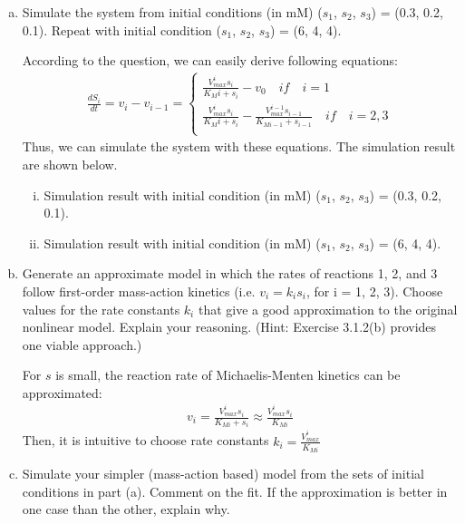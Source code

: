 \documentclass[paper=a4, fontsize=11pt]{scrartcl} %
\numberwithin{equation}{section} %
\numberwithin{figure}{section} %
\numberwithin{table}{section} %
\begin{document}
	\begin{enumerate}[a)]
		\item Simulate the system from initial conditions (in mM) ($s_1$, $s_2$, $s_3$) = (0.3, 0.2, 0.1). Repeat with initial condition ($s_1$, $s_2$, $s_3$) = (6, 4, 4).
		
		According to the question, we can easily derive following equations:
		\begin{gather*}
			\frac{dS_i}{dt}=v_i-v_{i-1}=
			\begin{cases}
				\frac{V^i_{max}s_i}{K_Mi+s_i}-v_0  \quad if \quad i = 1\\
				\frac{V^i_{max}s_i}{K_Mi+s_i}-\frac{V^{i-1}_{max}s_{i-1}}{K_{Mi-1}+s_{i-1}} \quad if \quad i = 2,3\\
			\end{cases}
		\end{gather*}
		Thus, we can simulate the system with these equations. The simulation result are shown below.
		\begin{enumerate}[i)]
			\item Simulation result with initial condition (in mM) ($s_1$, $s_2$, $s_3$) = (0.3, 0.2, 0.1).

			\item Simulation result with initial condition (in mM) ($s_1$, $s_2$, $s_3$) = (6, 4, 4).

		\end{enumerate}

		\item Generate an approximate model in which the rates of reactions 1, 2, and 3 follow first-order mass-action kinetics (i.e. $v_i = k_is_i$, for i = 1, 2, 3). Choose values for the rate constants $k_i$ that give a good approximation to the original nonlinear model. Explain your reasoning. (Hint: Exercise 3.1.2(b) provides one viable approach.)

		For $s$ is small, the reaction rate of Michaelis-Menten kinetics can be approximated:
		\begin{gather*}
			v_i=\frac{V^i_{max}s_i}{K_{Mi}+s_i}\approx \frac{V^i_{max}s_i}{K_{Mi}}
		\end{gather*}
		Then, it is intuitive to choose rate constants $k_i=\frac{V^i_{max}}{K_{Mi}}$

		\item Simulate your simpler (mass-action based) model from the sets of initial conditions in part (a). Comment on the fit. If the approximation is better in one case than the other, explain why.


	\end{enumerate}
\end{document}
